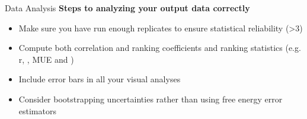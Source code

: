 \documentclass[9pt,bestpractices]{livecoms}
\begin{document}
\begin{Checklists*}
\begin{checklist}{Data Analysis}
    \textbf{Steps to analyzing your output data correctly}
\begin{itemize}
    \item Make sure you have run enough replicates to ensure statistical reliability (\textgreater3)
    \item Compute both correlation and ranking coefficients and ranking statistics (e.g. r, \textrho, MUE and \texttau)
    \item Include error bars in all your visual analyses
    \item Consider bootstrapping uncertainties rather than using free energy error estimators
\end{itemize}
\end{checklist}
\end{Checklists*}
\clearpage
\end{document}
